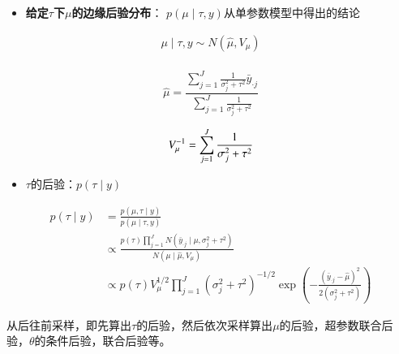 \begin{enumerate}
\begin{itemize}
\item
  \textbf{给定\(\tau\)下\(\mu\)的边缘后验分布}：
  \(p(\mu \mid \tau, y)\)从单参数模型中得出的结论
\end{itemize}

\begin{equation}
  \begin{array}{c}
    \mu \mid \tau, y \sim N\left(\hat{\mu}, V_{\mu}\right) \\
    \end{array}
\end{equation}


\[\hat{\mu}=\frac{\sum_{j=1}^{J} \frac{1}{\sigma_{j}^{2}+\tau^{2}} \bar{y}_{\cdot j}}{\sum_{j=1}^{J} \frac{1}{\sigma_{j}^{2}+\tau^{2}}}\]

\[\\V_{\mu}^{-1}=\sum_{j=1}^{J} \frac{1}{\sigma_{j}^{2}+\tau^{2}}\]

\begin{itemize}
\item
  \(\tau\)的后验：\(p(\tau \mid y) \)
\end{itemize}

\begin{equation}
  \begin{aligned}
    p(\tau \mid y) 
    &=\frac{p(\mu, \tau \mid y)}{p(\mu \mid \tau, y)} \\
    &\propto 
    \frac{p(\tau) \prod_{j=1}^{J} 
    N\left(\bar{y}_{ \cdot j }\mid \mu, \sigma_{j}^{2}+\tau^{2}\right)}
    {N\left(\mu \mid \hat{\mu}, V_{\mu}\right)} \\
    & \propto p(\tau) V_{\mu}^{1 / 2} 
    \prod_{j=1}^{J}\left(\sigma_{j}^{2}+\tau^{2}\right)^{-1 / 2} 
    \exp \left(
    -\frac{\left(\bar{y}_{\cdot j}-\hat{\mu}\right)^{2}}{2\left(\sigma_{j}^{2}+\tau^{2}\right)}
    \right)
    \end{aligned}
\end{equation}

从后往前采样，即先算出\(\tau\)的后验，然后依次采样算出\(\mu\)的后验，超参数联合后验，\(\theta\)的条件后验，联合后验等。


\end{enumerate}